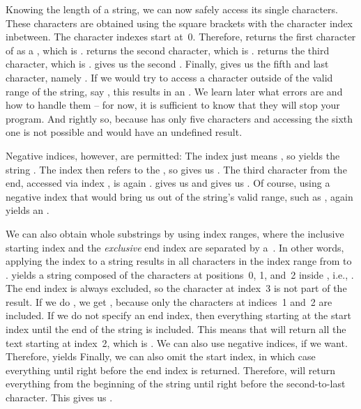 Knowing the length of a string, we can now safely access its single characters.
These characters are obtained using the square brackets \pythonil{[]}\pythonIdx{[}\pythonIdx{]} with the character index inbetween.
The character indexes start at~0.
Therefore, \pythonIdx{[}\pythonIdx{]} returns the first character of  as a , which is \pythonIdx{\textquotedbl}.
 returns the second character, which is .
 returns the third character, which is .
\pythonIdx{[}\pythonIdx{]} gives us the second .
Finally,  gives us the fifth and last character, namely \pythonIdx{\textquotedbl}.
If we would try to access a character outside of the valid range of the string, say , this results in an .
We learn later what errors are and how to handle them -- for now, it is sufficient to know that they will stop your program.
And rightly so, because \pythonIdx{\textquotedbl} has only five characters and accessing the sixth one is not possible and would have an undefined result.

Negative indices, however, are permitted:
The index  just means , so  yields the string .
The index  then refers to the , so  gives us .
The third character from the end, accessed via index , is again .
 gives us  and  gives us .
Of course, using a negative index that would bring us out of the string's valid range, such as , again yields an .

We can also obtain whole substrings by using index ranges, where the inclusive starting index and the \emph{exclusive} end index are separated by a~\pythonilIdx{:}.
In other words, applying the index \pythonil{[a:b]} to a string results in all characters in the index range from  to .
 yields a string composed of the characters at positions~0, 1, and~2 inside , i.e., .
The end index is always excluded, so the character at index~3 is not part of the result.
If we do , we get , because only the characters at indices~1 and~2 are included.
If we do not specify an end index, then everything starting at the start index until the end of the string is included.
This means that  will return all the text starting at index~2, which is .
We can also use negative indices, if we want.
Therefore,  yields 
Finally, we can also omit the start index, in which case everything until right before the end index is returned.
Therefore,  will return everything from the beginning of the string until right before the second-to-last character.
This gives us .

